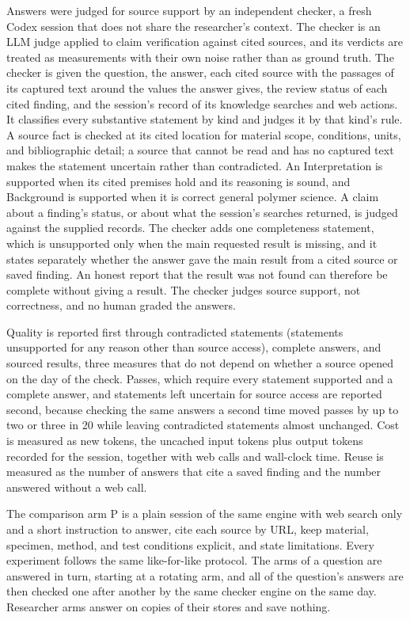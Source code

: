 \documentclass[journal=mamobx,manuscript=suppinfo]{achemso}
\begin{document}
Answers were judged for source support by an independent checker, a fresh Codex session that does not share the researcher's context.
The checker is an LLM judge\cite{Zheng2023Judging} applied to claim verification against cited sources,\cite{Wadden2020SciFact} and its verdicts are treated as measurements with their own noise rather than as ground truth.
The checker is given the question, the answer, each cited source with the passages of its captured text around the values the answer gives, the review status of each cited finding, and the session's record of its knowledge searches and web actions.
It classifies every substantive statement by kind and judges it by that kind's rule.
A source fact is checked at its cited location for material scope, conditions, units, and bibliographic detail; a source that cannot be read and has no captured text makes the statement uncertain rather than contradicted.
An Interpretation is supported when its cited premises hold and its reasoning is sound, and Background is supported when it is correct general polymer science.
A claim about a finding's status, or about what the session's searches returned, is judged against the supplied records.
The checker adds one completeness statement, which is unsupported only when the main requested result is missing, and it states separately whether the answer gave the main result from a cited source or saved finding.
An honest report that the result was not found can therefore be complete without giving a result.
The checker judges source support, not correctness, and no human graded the answers.

Quality is reported first through contradicted statements (statements unsupported for any reason other than source access), complete answers, and sourced results, three measures that do not depend on whether a source opened on the day of the check.
Passes, which require every statement supported and a complete answer, and statements left uncertain for source access are reported second, because checking the same answers a second time moved passes by up to two or three in 20 while leaving contradicted statements almost unchanged.
Cost is measured as new tokens, the uncached input tokens plus output tokens recorded for the session, together with web calls and wall-clock time.
Reuse is measured as the number of answers that cite a saved finding and the number answered without a web call.

The comparison arm P is a plain session of the same engine with web search only and a short instruction to answer, cite each source by URL, keep material, specimen, method, and test conditions explicit, and state limitations.
Every experiment follows the same like-for-like protocol.
The arms of a question are answered in turn, starting at a rotating arm, and all of the question's answers are then checked one after another by the same checker engine on the same day.
Researcher arms answer on copies of their stores and save nothing.
\end{document}

